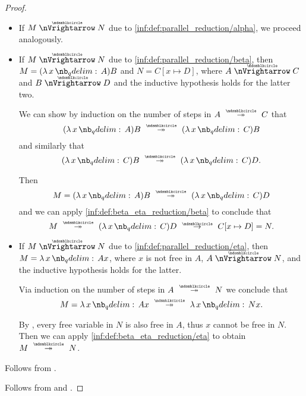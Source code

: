 \begin{proof}
\begin{itemize}
    \item If \( M \ppred N \) due to \ref{inf:def:parallel_reduction/alpha}, we proceed analogously.

    \item If \( M \ppred N \) due to \ref{inf:def:parallel_reduction/beta}, then \( M = (\qabs x A)B \) and \( N = C[x \mapsto D] \), where \( A \ppred C \) and \( B \ppred D \) and the inductive hypothesis holds for the latter two.

    We can show by induction on the number of steps in \( A \pred* C \) that
    \begin{equation*}
      (\qabs x A)B \pred* (\qabs x C)B
    \end{equation*}
    and similarly that
    \begin{equation*}
      (\qabs x C)B \pred* (\qabs x C)D.
    \end{equation*}

    Then
    \begin{equation*}
      M = (\qabs x A) B \pred* (\qabs x C)D
    \end{equation*}
    and we can apply \ref{inf:def:beta_eta_reduction/beta} to conclude that
    \begin{equation*}
      M \pred* (\qabs x C)D \pred C[x \mapsto D] = N.
    \end{equation*}

    \item If \( M \ppred N \) due to \ref{inf:def:parallel_reduction/eta}, then \( M = \qabs x A x \), where \( x \) is not free in \( A \), \( A \ppred N \), and the inductive hypothesis holds for the latter.

    Via induction on the number of steps in \( A \pred* N \) we conclude that
    \begin{equation*}
      M = \qabs x A x \pred* \qabs x N x.
    \end{equation*}

    By , every free variable in \( N \) is also free in \( A \), thus \( x \) cannot be free in \( N \). Then we can apply \ref{inf:def:beta_eta_reduction/eta} to obtain \( M \pred* N \).
  \end{itemize}

   Follows from .

   Follows from  and .
\end{proof}

